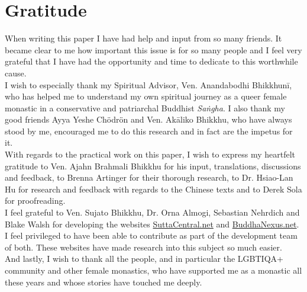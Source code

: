 \section{Gratitude}

When writing this paper I have had help and input from so many friends. It became clear to me how important this issue is for so many people and I feel very grateful that I have had the opportunity and time to dedicate to this worthwhile cause.\\

I wish to especially thank my Spiritual Advisor, Ven. Anandabodhi Bhikkhunī, who has helped me to understand my own spiritual journey as a queer female monastic in a conservative and patriarchal Buddhist {\em Saṅgha}. I also thank my good friends Ayya Yeshe Chödrön and Ven. Akāliko Bhikkhu, who have always stood by me, encouraged me to do this research and in fact are the impetus for it.\\

With regards to the practical work on this paper, I wish to express my heartfelt gratitude to Ven. Ajahn Brahmali Bhikkhu for his input, translations, discussions and feedback, to Brenna Artinger for their thorough research, to Dr. Hsiao-Lan Hu for research and feedback with regards to the Chinese texts and to Derek Sola for proofreading.\\

I feel grateful to Ven. Sujato Bhikkhu, Dr. Orna Almogi, Sebastian Nehrdich and Blake Walsh for developing the websites \href{https://suttacentral.net/}{SuttaCentral.net} and \href{https://buddhanexus.net/}{BuddhaNexus.net}. I feel privileged to have been able to contribute as part of the development team of both. These websites have made research into this subject so much easier.\\

And lastly, I wish to thank all the people, and in particular the LGBTIQA+ community and other female monastics, who have supported me as a monastic all these years and whose stories have touched me deeply.
